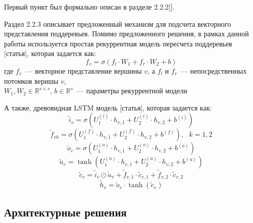 Первый пункт был формально описан в разделе 2.2.2[].

Раздел 2.2.3 описывает предложенный механизм для подсчета векторного представления поддеревьев.
Помимо предложенного решения, в рамках данной работы используется простая рекуррентная модель пересчета поддеревьев [статья], которая задается как:
$$f_v = \sigma(f_l \cdot W_1 + f_r \cdot W_2 + b)$$
где $f_v$~--- векторное представление вершины $v$, а $f_l$ и $f_r$~--- непосредственных
потомков веришы $v$,\\
$W_1, W_2 \in \mathbb{R}^{s \times s}$,
$b \in \mathbb{R}^s$~--- параметры рекуррентной модели

А также, древовидная LSTM модель [статья], которая задается как:
$$\tilde{i}_v=\sigma \left( U_1^{(i)} \cdot h_{v,1} + U_2^{(i)} \cdot h_{v,2} + b^{(i)} \right)$$
$$\tilde{f}_{vk}=\sigma \left( U_1^{(f)} \cdot h_{v,1} + U_2^{(f)} \cdot h_{v,2} + b^{(f)} \right),\text{ }k=1,2$$
$$\tilde{o}_{v}=\sigma \left( U_1^{(o)} \cdot h_{v,1} + U_2^{(o)} \cdot h_{v,2} + b^{(o)} \right)$$
$$\tilde{u}_{v}=\tanh \left( U_1^{(u)} \cdot h_{v,1} + U_2^{(u)} \cdot h_{v,2} + b^{(u)} \right)$$
$$\tilde{c}_v=\tilde{i}_v \odot \tilde{u}_v + \tilde{f}_{v,1} \cdot \tilde{c}_{v, 1} + \tilde{f}_{v,2} \cdot \tilde{c}_{v, 2}$$
$$\tilde{h}_v=\tilde{o}_v \cdot \tanh(\tilde{c}_v)$$

\subsection{Архитектурные решения}
 